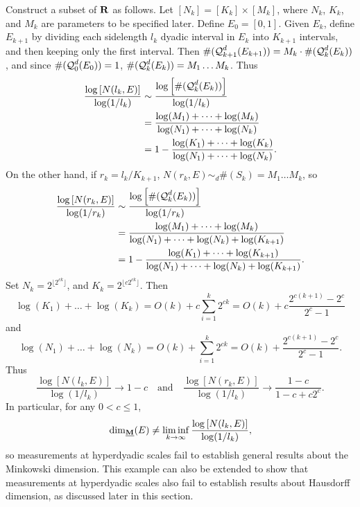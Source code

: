 \begin{example}
	Construct a subset of $\operatorname{\mathbf{R}}$ as follows. Let $[N_k] = [K_k] \times [M_k]$, where $N_k$, $K_k$, and $M_k$ are parameters to be specified later. Define $E_0 = [0,1]$. Given $E_k$, define $E_{k+1}$ by dividing each sidelength $l_k$ dyadic interval in $E_k$ into $K_{k+1}$ intervals, and then keeping only the first interval. Then $\#(\operatorname{\mathcal{Q}}_{k+1}^d(E_{k+1})) = M_k \cdot \#(\operatorname{\mathcal{Q}}_k^d(E_k))$, and since $\#(\operatorname{\mathcal{Q}}_0^d(E_0)) = 1$, $\#(\operatorname{\mathcal{Q}}_k^d(E_k)) = M_1 \dots M_k$. Thus
	\begin{align*}
		\frac{\log \left[ N(l_k,E) \right]}{\log(1/l_k)} &\sim \frac{\log \left[ \#(\operatorname{\mathcal{Q}}_k^d(E_k)) \right]}{\log(1/l_k)}\\
		&= \frac{\log(M_1) + \dots + \log(M_k)}{\log(N_1) + \dots + \log(N_k)}\\
		&= 1 - \frac{\log(K_1) + \dots + \log(K_k)}{\log(N_1) + \dots + \log(N_k)}.
	\end{align*}
	On the other hand, if $r_k = l_k/K_{k+1}$, $N(r_k,E) \sim_d \#(S_k) = M_1 \dots M_k$, so
	\begin{align*}
		\frac{\log \left[ N(r_k,E) \right]}{\log(1/r_k)} &\sim \frac{\log \left[ \#(\operatorname{\mathcal{Q}}_k^d(E_k)) \right]}{\log(1/r_k)}\\
		&= \frac{\log(M_1) + \dots + \log(M_k)}{\log(N_1) + \dots + \log(N_k) + \log(K_{k+1})}\\
		&= 1 - \frac{\log(K_1) + \dots + \log(K_{k+1})}{\log(N_1) + \dots + \log(N_k) + \log(K_{k+1})}.
	\end{align*}
	Set $N_k = 2^{\lfloor 2^{ck} \rfloor}$, and $K_k = 2^{\lfloor c 2^{ck} \rfloor}$. Then
	\[ \log(K_1) + \dots + \log(K_k) = O(k) + c \sum_{i = 1}^k 2^{ck} = O(k) + c \frac{2^{c(k+1)} - 2^c}{2^c - 1} \]
	and
	\[ \log(N_1) + \dots + \log(N_k) = O(k) + \sum_{i = 1}^k 2^{ck} = O(k) + \frac{2^{c(k+1)} - 2^c}{2^c - 1}. \]
	Thus
	\[ \frac{\log \left[ N(l_k,E) \right]}{\log(1/l_k)} \to 1 - c \quad \text{and} \quad \frac{\log \left[ N(r_k,E) \right]}{\log(1/l_k)} \to \frac{1 - c}{1 - c + c2^c}. \]
	In particular, for any $0 < c \leq 1$,
	\[ \operatorname{\dim_{\underline{\mathbf{M}}}}(E) \neq \liminf_{k \to \infty} \frac{\log \left[ N(l_k,E) \right]}{\log(1/l_k)}, \]
	so measurements at hyperdyadic scales fail to establish general results about the Minkowski dimension. This example can also be extended to show that measurements at hyperdyadic scales also fail to establish results about Hausdorff dimension, as discussed later in this section.



\end{example}
